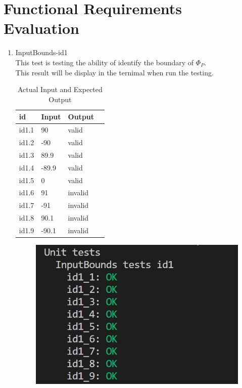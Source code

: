 \documentclass[12pt, titlepage]{article}
\begin{document}
\section{Functional Requirements Evaluation}
\begin{enumerate}

\item{InputBounds-id1\\} 
This test is testing the ability of identify the boundary of $\Phi_P$.\\
This result will be display in the ternimal when run the testing.

\begin{table}[h!]
\centering
\noindent \begin{tabular}{l l l l} 
    \toprule		
    \textbf{id} & \textbf{Input} & \textbf{Output}\\ 
	\midrule
   id1.1 &  90  & valid\\
   id1.2 & -90  & valid\\
   id1.3 &  89.9  & valid\\
   id1.4 & -89.9  & valid\\
   id1.5 & 0  & valid\\
   id1.6 & 91  & invalid\\
   id1.7 & -91  & invalid\\
   id1.8 & 90.1  & invalid\\
   id1.9 & -90.1  & invalid\\
    \bottomrule
  \end{tabular}
\caption{Actual Input and Expected Output}
\end{table}


\begin{figure}[hbt!]
 \centering
 \includegraphics[scale=.5]{InputBounds-id1}
\end{figure}


\end{enumerate}
\end{document}
